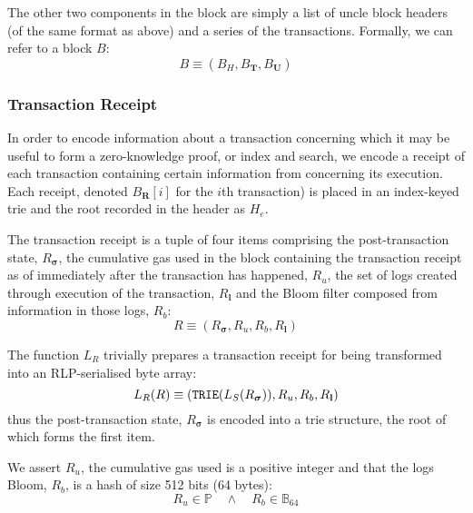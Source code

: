 \documentclass[9pt,oneside]{amsart}
\begin{document}
\begin{multicols}{2}
The other two components in the block are simply a list of uncle block headers (of the same format as above) and a series of the transactions. Formally, we can refer to a block $B$:
\begin{equation}
B \equiv (B_H, B_\mathbf{T}, B_\mathbf{U})
\end{equation}

\subsubsection{Transaction Receipt}

In order to encode information about a transaction concerning which it may be useful to form a zero-knowledge proof, or index and search, we encode a receipt of each transaction containing certain information from concerning its execution. Each receipt, denoted $B_\mathbf{R}[i]$ for the $i$th transaction) is placed in an index-keyed trie and the root recorded in the header as $H_e$.

The transaction receipt is a tuple of four items comprising the post-transaction state, $R_{\boldsymbol{\sigma}}$, the cumulative gas used in the block containing the transaction receipt as of immediately after the transaction has happened, $R_u$, the set of logs created through execution of the transaction, $R_\mathbf{l}$ and the Bloom filter composed from information in those logs, $R_b$:
\begin{equation}
R \equiv (R_{\boldsymbol{\sigma}}, R_u, R_b, R_\mathbf{l})
\end{equation}

The function $L_R$ trivially prepares a transaction receipt for being transformed into an RLP-serialised byte array:
\begin{equation}
L_R(R) \equiv (\mathtt{\small TRIE}(L_S(R_{\boldsymbol{\sigma}})), R_u, R_b, R_\mathbf{l})
\end{equation}
thus the post-transaction state, $R_{\boldsymbol{\sigma}}$ is encoded into a trie structure, the root of which forms the first item.

We assert $R_u$, the cumulative gas used is a positive integer and that the logs Bloom, $R_b$, is a hash of size 512 bits (64 bytes):
\begin{equation}
R_u \in \mathbb{P} \quad \wedge \quad R_b \in \mathbb{B}_{64}
\end{equation}



\end{multicols}
\end{document}
